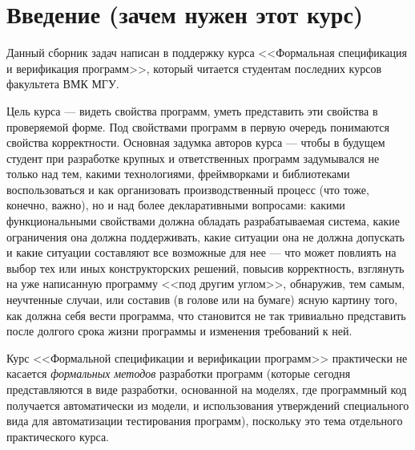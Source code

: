\pagebreak
\section*{Введение (зачем нужен этот курс)}

Данный сборник задач написан в поддержку курса <<Формальная спецификация и верификация программ>>, который читается студентам последних курсов факультета ВМК МГУ.

Цель курса --- видеть свойства программ, уметь представить эти свойства в проверяемой форме. Под свойствами программ в первую очередь понимаются свойства корректности. Основная задумка авторов курса --- чтобы в будущем студент при разработке крупных и ответственных программ задумывался не только над тем, какими технологиями, фреймворками и библиотеками воспользоваться и как организовать производственный процесс (что тоже, конечно, важно), но и над более декларативными вопросами: какими функциональными свойствами должна обладать разрабатываемая система, какие ограничения она должна поддерживать, какие ситуации она не должна допускать и какие ситуации составляют все возможные для нее --- что может повлиять на выбор тех или иных конструкторских решений, повысив корректность, взглянуть на уже написанную программу <<под другим углом>>, обнаружив, тем самым, неучтенные случаи, или составив (в голове или на бумаге) ясную картину того, как должна себя вести программа, что становится не так тривиально представить после долгого срока жизни программы и изменения требований к ней.

Курс <<Формальной спецификации и верификации программ>> практически не касается \emph{формальных методов} разработки программ (которые сегодня представляются в виде разработки, основанной на моделях, где программный код получается автоматически из модели, и использования утверждений специального вида для автоматизации тестирования программ), поскольку это тема отдельного практического курса.

